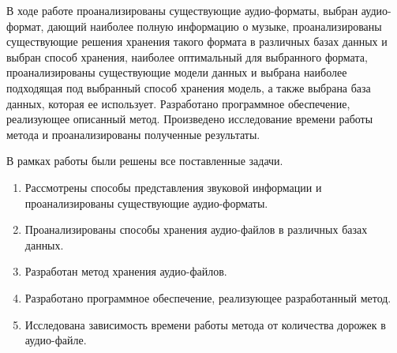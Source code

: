 \Conclusion %

В ходе работе проанализированы существующие аудио-форматы, выбран аудио-формат, дающий наиболее полную информацию о музыке, проанализированы существующие решения хранения такого формата в различных базах данных и выбран способ хранения, наиболее оптимальный для выбранного формата, проанализированы существующие модели данных и выбрана наиболее подходящая под выбранный способ хранения модель, а также выбрана база данных, которая ее использует. Разработано программное обеспечение, реализующее описанный метод. Произведено исследование времени работы метода и проанализированы полученные результаты.

В рамках работы были решены все поставленные задачи.
\begin{enumerate}
    \item Рассмотрены способы представления звуковой информации и проанализированы существующие аудио-форматы.
    \item Проанализированы способы хранения аудио-файлов в различных базах данных.
    \item Разработан метод хранения аудио-файлов.
    \item Разработано программное обеспечение, реализующее разработанный метод.
    \item Исследована зависимость времени работы метода от количества дорожек в аудио-файле.
\end{enumerate}





